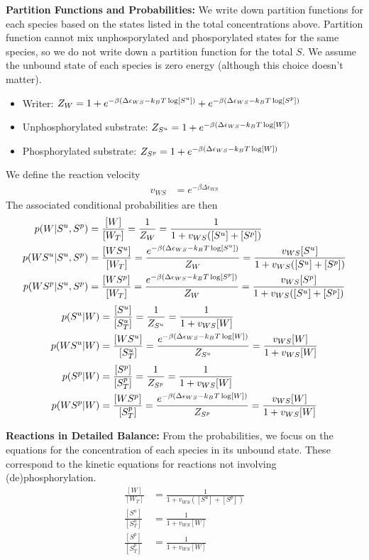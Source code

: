 \documentclass[aps,onecolumn,superscriptaddress,notitlepage]{revtex4-1}
\begin{document}
\textbf{Partition Functions and Probabilities:}
We write down partition functions for each species based on the states listed in the total concentrations above. 
Partition function cannot mix unphosporylated and phosporylated states for the same species, 
so we do not write down a partition function for the total $S$.
We assume the unbound state of each species is zero energy (although this choice doesn't matter).
\begin{itemize}
\item Writer: $Z_W = 1 + e^{-\beta\qty(\Delta\epsilon_{WS} -k_BT \log[S^u])} + e^{-\beta(\Delta\epsilon_{WS} -k_BT \log[S^p])}$
\item Unphosphorylated substrate: $Z_{S^u} = 1 + e^{-\beta\qty(\Delta\epsilon_{WS} -k_BT \log[W])}$
\item Phosphorylated substrate: $Z_{S^p} = 1 + e^{-\beta\qty(\Delta\epsilon_{WS} -k_BT \log[W])}$
\end{itemize}
We define the reaction velocity
\begin{align}
v_{WS} &= e^{-\beta\Delta\epsilon_{WS}}
\end{align}
The associated conditional probabilities are then
\begin{align}
p(W|S^u,S^p) &= \frac{[W]}{[W_T]} = \frac{1}{Z_W} =  \frac{1}{1 + v_{WS}([S^u] +[S^p])}\\
p(WS^u|S^u,S^p) &= \frac{[WS^u]}{[W_T]}  = \frac{e^{-\beta\qty(\Delta\epsilon_{WS} -k_BT \log[S^u])}}{Z_W} =  \frac{v_{WS}[S^u]}{1 + v_{WS}([S^u] +[S^p])}\\
p(WS^p|S^u,S^p) &= \frac{[WS^p]}{[W_T]}  = \frac{e^{-\beta\qty(\Delta\epsilon_{WS} -k_BT \log[S^p])}}{Z_W} =  \frac{v_{WS}[S^p]}{1 + v_{WS}([S^u] +[S^p])}
\end{align}
\begin{align}
p(S^u|W) &= \frac{[S^u]}{[S^u_T]} = \frac{1}{Z_{S^u}} = \frac{1}{1 + v_{WS}[W]}\\
p(WS^u|W) &= \frac{[WS^u]}{[S^u_T]} = \frac{ e^{-\beta\qty(\Delta\epsilon_{WS} -k_BT \log[W])}}{Z_{S^u}} = \frac{v_{WS}[W]}{1 + v_{WS}[W]}
\end{align}
\begin{align}
p(S^p|W) &= \frac{[S^p]}{[S^p_T]} = \frac{1}{Z_{S^p}} = \frac{1}{1 + v_{WS}[W]}\\
p(WS^p|W) &= \frac{[WS^p]}{[S^p_T]} = \frac{ e^{-\beta\qty(\Delta\epsilon_{WS} -k_BT \log[W])}}{Z_{S^p}} = \frac{v_{WS}[W]}{1 + v_{WS}[W]}
\end{align}


\textbf{Reactions in Detailed Balance:}
From the probabilities, we focus on the equations for the concentration of each species in its unbound state.
These correspond to the kinetic equations for reactions not involving (de)phosphorylation.
\begin{align}
\frac{[W]}{[W_T]} & = \frac{1}{1 + v_{WS}([S^u] +[S^p])}\label{eq:onewayW}\\
\frac{[S^u]}{[S^u_T]} &= \frac{1}{1 + v_{WS}[W]}\label{eq:onewaySu}\\
\frac{[S^p]}{[S^p_T]} &=  \frac{1}{1 + v_{WS}[W]}\label{eq:onewaySp}
\end{align}
\end{document}
